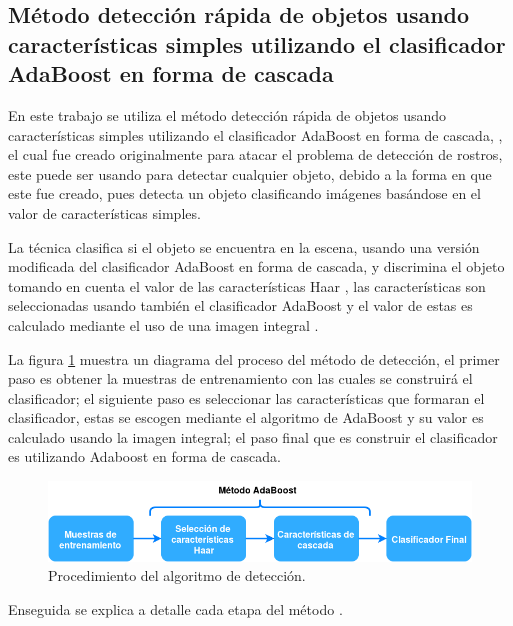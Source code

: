 \subsection{Método detección rápida de objetos usando características simples utilizando el clasificador AdaBoost en forma de cascada}\label{subsec:ViolaJones}

En este trabajo se utiliza el método detección rápida de objetos usando características simples utilizando el clasificador AdaBoost en forma de cascada, \citep{Viola2001}, el cual fue creado originalmente para atacar el problema de detección de rostros, este puede ser usando para detectar cualquier objeto, debido a la forma en que este fue creado, pues detecta un objeto clasificando imágenes basándose en el valor de características simples.

La técnica clasifica si el objeto se encuentra en la escena, usando una versión modificada del clasificador AdaBoost \citep{Freund1995} en forma de cascada, y discrimina el objeto tomando en cuenta el valor de las características Haar \citep{Viola2001}, las características son seleccionadas usando también el clasificador AdaBoost y el valor de estas es calculado mediante el uso de una imagen integral \citep{Viola2001}. 

La figura \ref{fig:ViolaJonesDiagram} muestra un diagrama del proceso del método de detección, el primer paso es obtener la muestras de entrenamiento con las cuales se construirá el clasificador; el siguiente paso es seleccionar las características que formaran el clasificador, estas se escogen mediante el algoritmo de AdaBoost y su valor es calculado usando la imagen integral; el paso final que es construir el clasificador es utilizando 
Adaboost en forma de cascada.

\begin{figure}[h!]
\begin{center}
\includegraphics[scale=.6]{./Figures/ViolaJonesDiagram.png}
\end{center}
\caption{Procedimiento del algoritmo de detección.}
\label{fig:ViolaJonesDiagram}
\end{figure}

Enseguida se explica a detalle cada etapa del método \citep{Viola2001}. 

